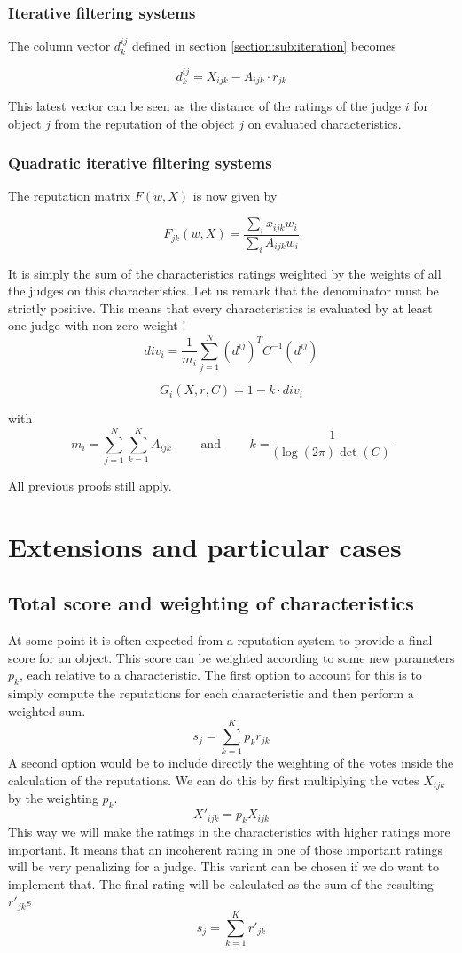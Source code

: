 \documentclass[12pt,a4paper]{article}
\begin{document}
\subsubsection{Iterative filtering systems}
 The column vector $d_k^{ij}$ defined in section \ref{section:sub:iteration} becomes
 
\[
    d^{ij}_k = X_{ijk} - A_{ijk}   \cdot r_{jk}
\]

This latest vector can be seen as the distance of the ratings of the judge $i$ for object $j$ from the reputation of the object $j$ on evaluated characteristics.

\subsubsection{Quadratic iterative filtering systems}

The reputation matrix $F(w, X)$ is now given by

\[
    F_{jk}(w, X) = \frac{\sum_i x_{ijk}w_i}{\sum_i A_{ijk}w_i}
\]

It is simply the sum of the characteristics ratings weighted by the weights of all the judges on this characteristics. Let us remark that the denominator must be strictly positive. This means that every characteristics is evaluated by at least one judge with non-zero weight !\\

\[
    div_i = \frac{1}{m_i} \sum_{j=1}^{N} (d^{ij})^TC^{-1}(d^{ij})
\]

\[
    G_i(X, r, C) = 1 - k \cdot div_i
\]

with
\[
    m_i = \sum_{j=1}^{N} \sum_{k=1}^{K} A_{ijk} \qquad \text{ and } \qquad k = \frac{1}{(\log(2\pi)\det(C)}
\]

All previous proofs still apply.


\section{Extensions and particular cases}
\subsection{Total score and weighting of characteristics}
At some point it is often expected from a reputation system to provide a final score for an object. This score can be weighted according to some new parameters $p_k$, each relative to a characteristic.
The first option to account for this is to simply compute the reputations for each characteristic and then perform a weighted sum.
$$ s_j = \sum_{k=1}^K p_k r_{jk} $$
A second option would be to include directly the weighting of the votes inside the calculation of the reputations. We can do this by first multiplying the votes $X_{ijk}$ by the weighting $p_k$. 
$$X'_{ijk} = p_k X_{ijk}$$
This way we will make the ratings in the characteristics with higher ratings more important. It means that an incoherent rating in one of those important ratings will be very penalizing for a judge. This variant can be chosen if we do want to implement that.
The final rating will be calculated as the sum of the resulting $r'_{jk}$s
$$ s_j = \sum_{k=1}^K r'_{jk}$$
\end{document}
